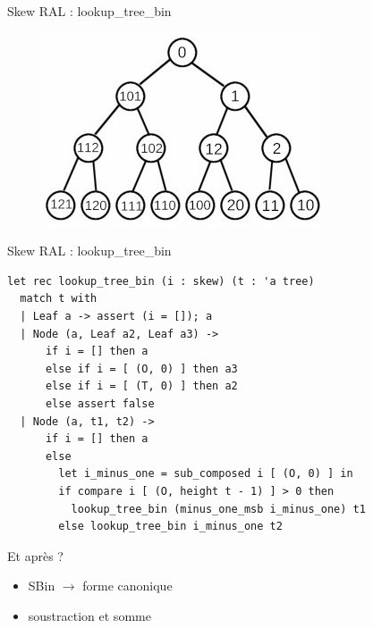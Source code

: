 \documentclass{beamer}
\begin{document}
\begin{frame}{Skew RAL : lookup\_tree\_bin}
\begin{figure}
    \centering
   \includegraphics[width=\textwidth]{full_tree_numbered.png}
\end{figure}
    
\end{frame}

\begin{frame}[fragile]{Skew RAL : lookup\_tree\_bin}
\begin{lstlisting}
let rec lookup_tree_bin (i : skew) (t : 'a tree)
  match t with
  | Leaf a -> assert (i = []); a
  | Node (a, Leaf a2, Leaf a3) ->
      if i = [] then a
      else if i = [ (O, 0) ] then a3
      else if i = [ (T, 0) ] then a2
      else assert false
  | Node (a, t1, t2) ->
      if i = [] then a
      else
        let i_minus_one = sub_composed i [ (O, 0) ] in
        if compare i [ (O, height t - 1) ] > 0 then
          lookup_tree_bin (minus_one_msb i_minus_one) t1
        else lookup_tree_bin i_minus_one t2
\end{lstlisting}
    
\end{frame}

\begin{frame}{Et après ?}
\begin{itemize}
    \item SBin $\rightarrow$ forme canonique
    \item soustraction et somme
\end{itemize}
    
\end{frame}
\end{document}
